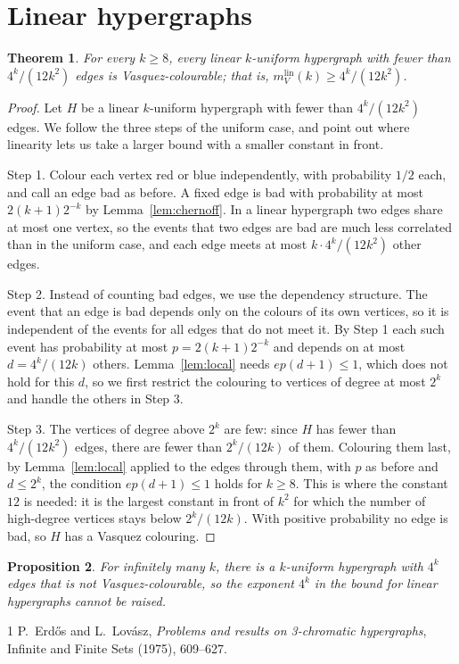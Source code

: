 \documentclass[11pt]{amsart}
\newtheorem{thm}{Theorem}[section]
\newtheorem{prop}[thm]{Proposition}
\begin{document}
\section{Linear hypergraphs}

\begin{thm}\label{thm:linear}
For every $k \geq 8$, every linear $k$-uniform hypergraph with fewer than $4^{k}/(12 k^2)$ edges is Vasquez-colourable; that is, $m_V^{\mathrm{lin}}(k) \geq 4^{k}/(12 k^2)$.
\end{thm}

\begin{proof}
Let $H$ be a linear $k$-uniform hypergraph with fewer than $4^{k}/(12 k^2)$ edges. We follow the three steps of the uniform case, and point out where linearity lets us take a larger bound with a smaller constant in front.

Step 1. Colour each vertex red or blue independently, with probability $1/2$ each, and call an edge bad as before. A fixed edge is bad with probability at most $2(k+1) 2^{-k}$ by Lemma~\ref{lem:chernoff}. In a linear hypergraph two edges share at most one vertex, so the events that two edges are bad are much less correlated than in the uniform case, and each edge meets at most $k \cdot 4^{k}/(12 k^2)$ other edges.

Step 2. Instead of counting bad edges, we use the dependency structure. The event that an edge is bad depends only on the colours of its own vertices, so it is independent of the events for all edges that do not meet it. By Step 1 each such event has probability at most $p = 2(k+1) 2^{-k}$ and depends on at most $d = 4^{k}/(12 k)$ others. Lemma~\ref{lem:local} needs $e p (d+1) \leq 1$, which does not hold for this $d$, so we first restrict the colouring to vertices of degree at most $2^{k}$ and handle the others in Step 3.

Step 3. The vertices of degree above $2^{k}$ are few: since $H$ has fewer than $4^{k}/(12 k^2)$ edges, there are fewer than $2^{k}/(12 k)$ of them. Colouring them last, by Lemma~\ref{lem:local} applied to the edges through them, with $p$ as before and $d \leq 2^{k}$, the condition $e p (d+1) \leq 1$ holds for $k \geq 8$. This is where the constant $12$ is needed: it is the largest constant in front of $k^2$ for which the number of high-degree vertices stays below $2^{k}/(12 k)$. With positive probability no edge is bad, so $H$ has a Vasquez colouring.
\end{proof}

\begin{prop}\label{prop:sharp}
For infinitely many $k$, there is a $k$-uniform hypergraph with $4^{k}$ edges that is not Vasquez-colourable, so the exponent $4^k$ in the bound for linear hypergraphs cannot be raised.
\end{prop}

\begin{thebibliography}{1}
 P.~Erd\H{o}s and L.~Lov\'asz, \emph{Problems and results on 3-chromatic hypergraphs}, Infinite and Finite Sets (1975), 609--627.
\end{thebibliography}
\end{document}
